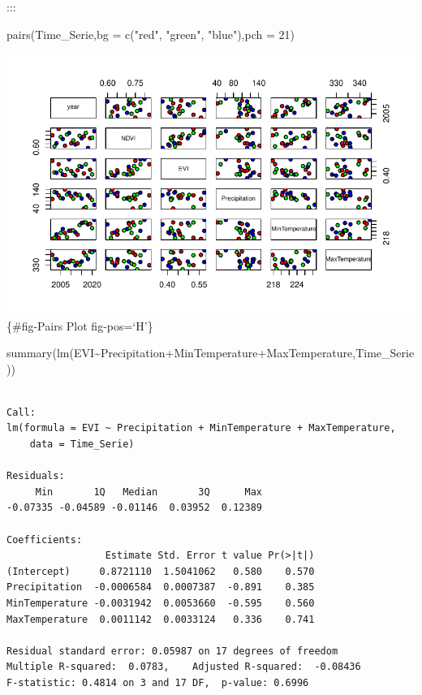 \documentclass[
  onepage,
  openany]{scrbook}
\newenvironment{Shaded}{}{}
\newcommand{\AttributeTok}[1]{\textcolor[rgb]{0.49,0.56,0.16}{#1}}
\newcommand{\DecValTok}[1]{\textcolor[rgb]{0.25,0.63,0.44}{#1}}
\newcommand{\FunctionTok}[1]{\textcolor[rgb]{0.02,0.16,0.49}{#1}}
\newcommand{\NormalTok}[1]{#1}
\newcommand{\SpecialCharTok}[1]{\textcolor[rgb]{0.25,0.44,0.63}{#1}}
\newcommand{\StringTok}[1]{\textcolor[rgb]{0.25,0.44,0.63}{#1}}
\begin{document}
:::

\begin{Shaded}
\begin{Highlighting}[]
\FunctionTok{pairs}\NormalTok{(Time\_Serie,}\AttributeTok{bg =} \FunctionTok{c}\NormalTok{(}\StringTok{"red"}\NormalTok{, }\StringTok{"green"}\NormalTok{, }\StringTok{"blue"}\NormalTok{),}\AttributeTok{pch =} \DecValTok{21}\NormalTok{)}
\end{Highlighting}
\end{Shaded}

\includegraphics{Quarto_files/figure-pdf/fig-Pairs Plot-1.pdf}\{\#fig-Pairs
Plot fig-pos=`H'\}

\begin{Shaded}
\begin{Highlighting}[]
\FunctionTok{summary}\NormalTok{(}\FunctionTok{lm}\NormalTok{(EVI}\SpecialCharTok{\textasciitilde{}}\NormalTok{Precipitation}\SpecialCharTok{+}\NormalTok{MinTemperature}\SpecialCharTok{+}\NormalTok{MaxTemperature,Time\_Serie))}
\end{Highlighting}
\end{Shaded}

\begin{verbatim}

Call:
lm(formula = EVI ~ Precipitation + MinTemperature + MaxTemperature, 
    data = Time_Serie)

Residuals:
     Min       1Q   Median       3Q      Max 
-0.07335 -0.04589 -0.01146  0.03952  0.12389 

Coefficients:
                 Estimate Std. Error t value Pr(>|t|)
(Intercept)     0.8721110  1.5041062   0.580    0.570
Precipitation  -0.0006584  0.0007387  -0.891    0.385
MinTemperature -0.0031942  0.0053660  -0.595    0.560
MaxTemperature  0.0011142  0.0033124   0.336    0.741

Residual standard error: 0.05987 on 17 degrees of freedom
Multiple R-squared:  0.0783,    Adjusted R-squared:  -0.08436 
F-statistic: 0.4814 on 3 and 17 DF,  p-value: 0.6996
\end{verbatim}
\end{document}
